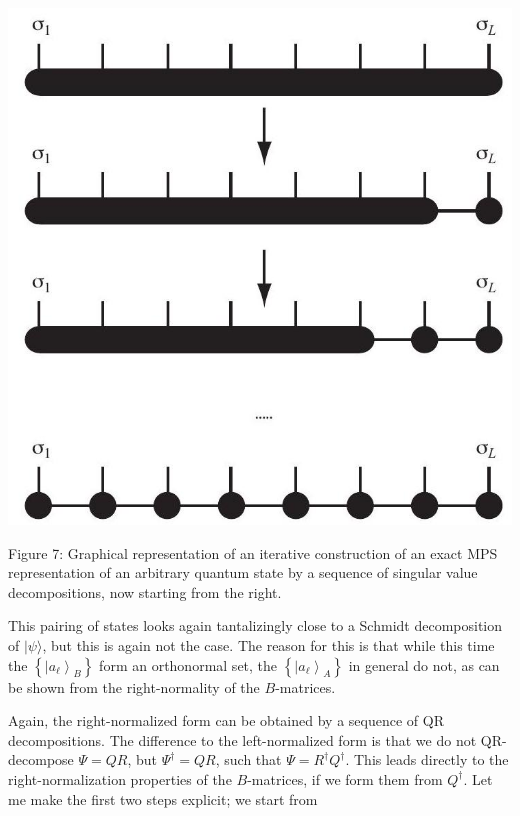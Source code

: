 \documentclass[12pt]{article}
\begin{document}
\begin{center}
\includegraphics[max width=\textwidth]{2024_05_04_afc4ad226da9ccfe0ac8g-023}
\end{center}

Figure 7: Graphical representation of an iterative construction of an exact MPS representation of an arbitrary quantum state by a sequence of singular value decompositions, now starting from the right.

This pairing of states looks again tantalizingly close to a Schmidt decomposition of $|\psi\rangle$, but this is again not the case. The reason for this is that while this time the $\left\{\left|a_{\ell}\right\rangle_{B}\right\}$ form an orthonormal set, the $\left\{\left|a_{\ell}\right\rangle_{A}\right\}$ in general do not, as can be shown from the right-normality of the $B$-matrices.

Again, the right-normalized form can be obtained by a sequence of QR decompositions. The difference to the left-normalized form is that we do not $\mathrm{QR}$-decompose $\Psi=Q R$, but $\Psi^{\dagger}=Q R$, such that $\Psi=R^{\dagger} Q^{\dagger}$. This leads directly to the right-normalization properties of the $B$-matrices, if we form them from $Q^{\dagger}$. Let me make the first two steps explicit; we start from
\end{document}
